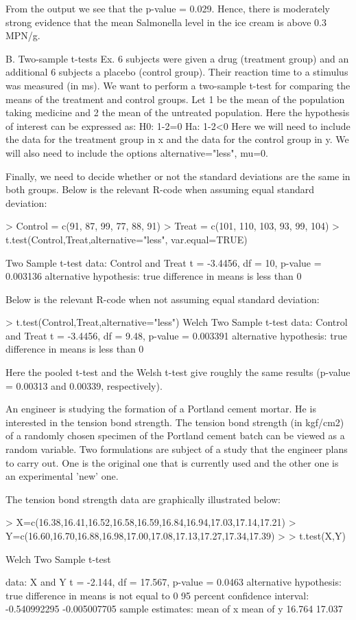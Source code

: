 From the output we see that the p-value = 0.029. Hence, there is moderately strong evidence that the mean Salmonella level in the ice cream is above 0.3 MPN/g.





B. Two-sample t-tests
Ex. 6 subjects were given a drug (treatment group) and an additional 6 subjects a placebo (control group). Their reaction time to a stimulus was measured (in ms). We want to perform a two-sample t-test for comparing the means of the treatment and control groups.
Let 1 be the mean of the population taking medicine and 2 the mean of the untreated population. Here the hypothesis of interest can be expressed as:
H0: 1-2=0
Ha: 1-2<0
Here we will need to include the data for the treatment group in x and the data for the control group in y. We will also need to include the options alternative="less", mu=0.

Finally, we need to decide whether or not the standard deviations are the same in both groups.
Below is the relevant R-code when assuming equal standard deviation:

> Control = c(91, 87, 99, 77, 88, 91)
> Treat = c(101, 110, 103, 93, 99, 104)
> t.test(Control,Treat,alternative="less", var.equal=TRUE)


Two Sample t-test
data: Control and Treat
t = -3.4456, df = 10, p-value = 0.003136
alternative hypothesis: true difference in means is less than 0


Below is the relevant R-code when not assuming equal standard deviation:

> t.test(Control,Treat,alternative="less")
Welch Two Sample t-test
data: Control and Treat
t = -3.4456, df = 9.48, p-value = 0.003391
alternative hypothesis: true difference in means is less than 0


Here the pooled t-test and the Welsh t-test give roughly the same results (p-value = 0.00313 and 0.00339, respectively).





An engineer is studying the formation of a Portland cement mortar. He is interested
in the tension bond strength. The tension bond strength (in kgf/cm2) of a randomly chosen specimen of the Portland cement batch can be viewed as a random variable. Two formulations are subject of a study that the engineer plans to carry out. One is the original one that is currently used and the other one is an experimental 'new' one. 

The tension bond strength data are graphically illustrated below:


> X=c(16.38,16.41,16.52,16.58,16.59,16.84,16.94,17.03,17.14,17.21)
> Y=c(16.60,16.70,16.88,16.98,17.00,17.08,17.13,17.27,17.34,17.39)
> 
> t.test(X,Y)

        Welch Two Sample t-test

data:  X and Y 
t = -2.144, df = 17.567, p-value = 0.0463
alternative hypothesis: true difference in means is not equal to 0 
95 percent confidence interval:
 -0.540992295 -0.005007705 
sample estimates:
mean of x mean of y 
   16.764    17.037 


